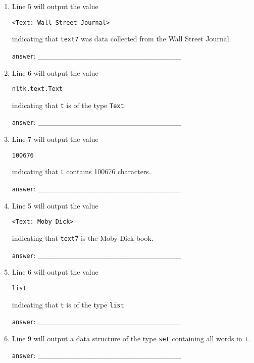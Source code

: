 \documentclass[a4paper,11pt]{scrartcl}
\begin{document}
\begin{enumerate}[label=\alph*)]
\singlespacing%
\item Line 5 will output the value
\begin{verbatim}
<Text: Wall Street Journal>
\end{verbatim}
indicating that \verb|text7| was data collected from the Wall Street Journal.

\verb|answer|: \_\_\_\_\_\_\_\_\_\_\_\_\_\_\_\_\_\_\_\_\_\_\_\_\_\_\_

\item Line 6 will output the value
\begin{verbatim}
nltk.text.Text
\end{verbatim}
indicating that \verb|t| is of the type \verb|Text|.

\verb|answer|: \_\_\_\_\_\_\_\_\_\_\_\_\_\_\_\_\_\_\_\_\_\_\_\_\_\_\_

\item Line 7 will output the value
\begin{verbatim}
100676
\end{verbatim}
indicating that \verb|t| contains 100676 characters.

\verb|answer|: \_\_\_\_\_\_\_\_\_\_\_\_\_\_\_\_\_\_\_\_\_\_\_\_\_\_\_

\item Line 5 will output the value
\begin{verbatim}
<Text: Moby Dick>
\end{verbatim}
indicating that \verb|text7| is the Moby Dick book.

\verb|answer|: \_\_\_\_\_\_\_\_\_\_\_\_\_\_\_\_\_\_\_\_\_\_\_\_\_\_\_

\item Line 6 will output the value
\begin{verbatim}
list
\end{verbatim}
indicating that \verb|t| is of the type \verb|list|

\verb|answer|: \_\_\_\_\_\_\_\_\_\_\_\_\_\_\_\_\_\_\_\_\_\_\_\_\_\_\_

\item Line 9 will output a data structure of the type \verb|set|
containing all words in \verb|t|.

\verb|answer|: \_\_\_\_\_\_\_\_\_\_\_\_\_\_\_\_\_\_\_\_\_\_\_\_\_\_\_


\end{enumerate}
\end{document}
